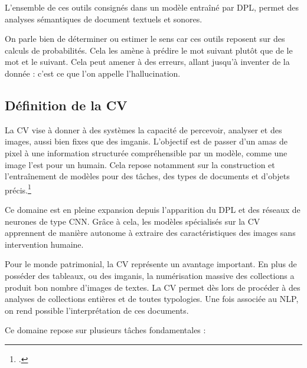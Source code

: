 L'ensemble de ces outils consignés dans un modèle entraîné par \gls{DPL}, permet des analyses sémantiques de document textuels et sonores.

On parle bien de déterminer ou estimer le sens car ces outils reposent sur des calculs de probabilités. Cela les amène à prédire le mot suivant plutôt que de  le mot et le suivant. Cela peut amener à des erreurs, allant jusqu'à inventer de la donnée : c'est ce que l'on appelle l'hallucination.


\subsection{Définition de la \gls{CV}}

La \gls{CV} vise à donner à des systèmes la capacité de percevoir, analyser et  des images, aussi bien fixes que des \glspl{imgani}. L'objectif est de passer d'un amas de pixel à une information structurée compréhensible par un modèle, comme une image l'est pour un humain. Cela repose notamment sur la construction et l'entraînement de modèles pour des tâches, des types de documents et d'objets précis.\footcite{QuestceQueVision}

Ce domaine est en pleine expansion depuis l'apparition du \gls{DPL} et des réseaux de neurones de type \gls{CNN}. Grâce à cela, les modèles spécialisés sur la \gls{CV} apprennent de manière autonome à extraire des caractéristiques des images sans intervention humaine.\newline

Pour le monde patrimonial, la \gls{CV} représente un avantage important. En plus de posséder des tableaux, ou des \glspl{imgani}, la numérisation massive des collections a produit bon nombre d'images de textes. La \gls{CV} permet dès lors de procéder à des analyses de collections entières et de toutes typologies. Une fois associée au \gls{NLP}, on rend possible l'interprétation de ces documents.

Ce domaine repose sur plusieurs tâches fondamentales :


